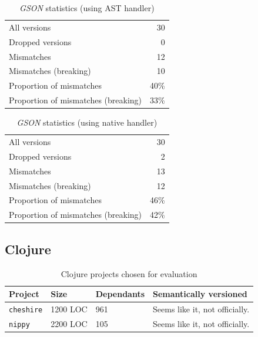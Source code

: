 \documentclass{l4proj}
\newcommand\genericstyle{\lstset{basicstyle=\ttm}}
\newcommand\codeinline[1]{{\genericstyle\lstinline!#1!}}
\begin{document}
\noindent
\begin{minipage}[t]{0.5\textwidth}
\begin{table}[H]
\centering
\begin{tabular}{|lr|}
All versions & 30 \\
Dropped versions & 0 \\
Mismatches & 12 \\
Mismatches (breaking) & 10 \\
Proportion of mismatches & 40\% \\
Proportion of mismatches (breaking) & 33\% \\
\end{tabular}
\caption{\textit{GSON} statistics (using AST handler)}
\label{GSONASTStatistics}
\end{table}
\end{minipage}
\begin{minipage}[t]{0.5\textwidth}
\begin{table}[H]
\centering
\begin{tabular}{|lr|}
All versions & 30 \\
Dropped versions & 2 \\
Mismatches & 13 \\
Mismatches (breaking) & 12 \\
Proportion of mismatches & 46\% \\
Proportion of mismatches (breaking) & 42\% \\
\end{tabular}
\caption{\textit{GSON} statistics (using native handler)}
\label{GSONNativeStatistics}
\end{table}
\end{minipage}


\subsection{Clojure}

\begin{table}[H]
\centering
\caption{Clojure projects chosen for evaluation}
\label{ClojureProjectsForEvaluation}
\begin{tabular}{|l|l|l|p{10cm}|}
\hline
\textbf{Project} & \textbf{Size} & \textbf{Dependants} & \textbf{Semantically versioned} \\
\hline
\codeinline{cheshire} & 1200 LOC & 961 & Seems like it, not
officially. \\
\codeinline{nippy} & 2200 LOC & 105 & Seems like it, not officially. \\
\hline
\end{tabular}
\end{table}
\end{document}
